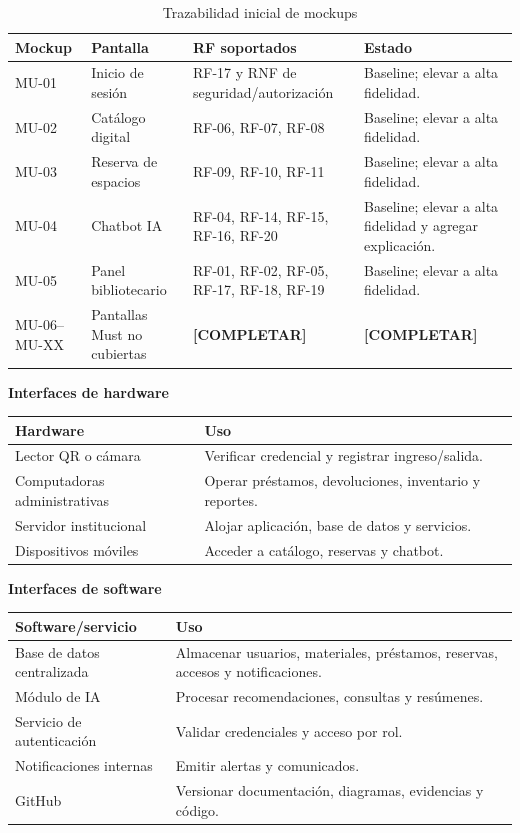 \documentclass[12pt,journal,onecolumn]{IEEEtran}
\newcommand{\completar}{\textcolor{red!70!black}{\textbf{[COMPLETAR]}}}
\begin{document}
\begin{table}[H]\centering
\caption{Trazabilidad inicial de mockups}
\begin{tabularx}{\textwidth}{P{0.13\textwidth}P{0.28\textwidth}Y P{0.16\textwidth}}\toprule
\textbf{Mockup} & \textbf{Pantalla} & \textbf{RF soportados} & \textbf{Estado}\\\midrule
MU-01 & Inicio de sesión & RF-17 y RNF de seguridad/autorización & Baseline; elevar a alta fidelidad.\\
MU-02 & Catálogo digital & RF-06, RF-07, RF-08 & Baseline; elevar a alta fidelidad.\\
MU-03 & Reserva de espacios & RF-09, RF-10, RF-11 & Baseline; elevar a alta fidelidad.\\
MU-04 & Chatbot IA & RF-04, RF-14, RF-15, RF-16, RF-20 & Baseline; elevar a alta fidelidad y agregar explicación.\\
MU-05 & Panel bibliotecario & RF-01, RF-02, RF-05, RF-17, RF-18, RF-19 & Baseline; elevar a alta fidelidad.\\
MU-06--MU-XX & Pantallas Must no cubiertas & \completar & \completar\\\bottomrule
\end{tabularx}
\end{table}

\medskip\noindent\textbf{Interfaces de hardware}\par\smallskip
\begin{tabularx}{\textwidth}{P{0.30\textwidth}Y}\toprule
\textbf{Hardware} & \textbf{Uso}\\\midrule
Lector QR o cámara & Verificar credencial y registrar ingreso/salida.\\
Computadoras administrativas & Operar préstamos, devoluciones, inventario y reportes.\\
Servidor institucional & Alojar aplicación, base de datos y servicios.\\
Dispositivos móviles & Acceder a catálogo, reservas y chatbot.\\\bottomrule
\end{tabularx}

\medskip\noindent\textbf{Interfaces de software}\par\smallskip
\begin{tabularx}{\textwidth}{P{0.30\textwidth}Y}\toprule
\textbf{Software/servicio} & \textbf{Uso}\\\midrule
Base de datos centralizada & Almacenar usuarios, materiales, préstamos, reservas, accesos y notificaciones.\\
Módulo de IA & Procesar recomendaciones, consultas y resúmenes.\\
Servicio de autenticación & Validar credenciales y acceso por rol.\\
Notificaciones internas & Emitir alertas y comunicados.\\
GitHub & Versionar documentación, diagramas, evidencias y código.\\\bottomrule
\end{tabularx}
\end{document}
